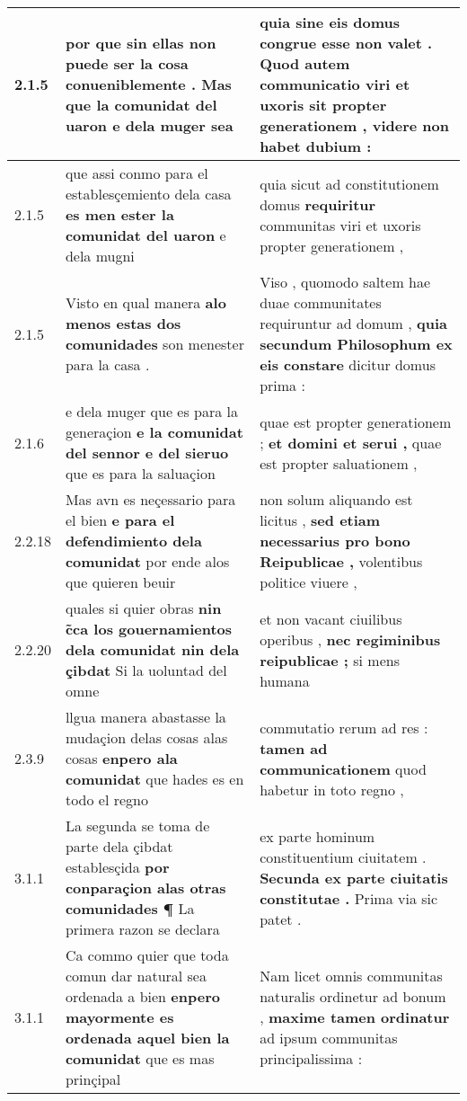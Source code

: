 \begin{tabular}{|p{1cm}|p{6.5cm}|p{6.5cm}|}
2.1.5 & por que sin ellas non puede ser la cosa conueniblemente . \textbf{ Mas que la comunidat del uaron } e dela muger sea & quia sine eis domus congrue esse non valet . \textbf{ Quod autem communicatio viri et uxoris sit propter generationem , } videre non habet dubium : \\\hline
2.1.5 & que assi conmo para el establesçemiento dela casa \textbf{ es men ester la comunidat del uaron } e dela mugni & quia sicut ad constitutionem domus \textbf{ requiritur } communitas viri et uxoris propter generationem , \\\hline
2.1.5 & Visto en qual manera \textbf{ alo menos estas dos comunidades } son menester para la casa . & Viso , quomodo saltem hae duae communitates requiruntur ad domum , \textbf{ quia secundum Philosophum ex eis constare } dicitur domus prima : \\\hline
2.1.6 & e dela muger que es para la generaçion \textbf{ e la comunidat del sennor e del sieruo } que es para la saluaçion & quae est propter generationem ; \textbf{ et domini et serui , } quae est propter saluationem , \\\hline
2.2.18 & Mas avn es neçessario para el bien \textbf{ e para el defendimiento dela comunidat } por ende alos que quieren beuir & non solum aliquando est licitus , \textbf{ sed etiam necessarius pro bono Reipublicae , } volentibus politice viuere , \\\hline
2.2.20 & quales si quier obras \textbf{ nin c̃ca los gouernamientos dela comunidat nin dela çibdat } Si la uoluntad del omne & et non vacant ciuilibus operibus , \textbf{ nec regiminibus reipublicae ; } si mens humana \\\hline
2.3.9 & llgua manera abastasse la mudaçion delas cosas alas cosas \textbf{ enpero ala comunidat } que hades es en todo el regno & commutatio rerum ad res : \textbf{ tamen ad communicationem } quod habetur in toto regno , \\\hline
3.1.1 & La segunda se toma de parte dela çibdat establesçida \textbf{ por conparaçion alas otras comunidades ¶ } La primera razon se declara & ex parte hominum constituentium ciuitatem . \textbf{ Secunda ex parte ciuitatis constitutae . } Prima via sic patet . \\\hline
3.1.1 & Ca commo quier que toda comun dar natural sea ordenada a bien \textbf{ enpero mayormente es ordenada aquel bien la comunidat } que es mas prinçipal & Nam licet omnis communitas naturalis ordinetur ad bonum , \textbf{ maxime tamen ordinatur } ad ipsum communitas principalissima : \\\hline

\end{tabular}
